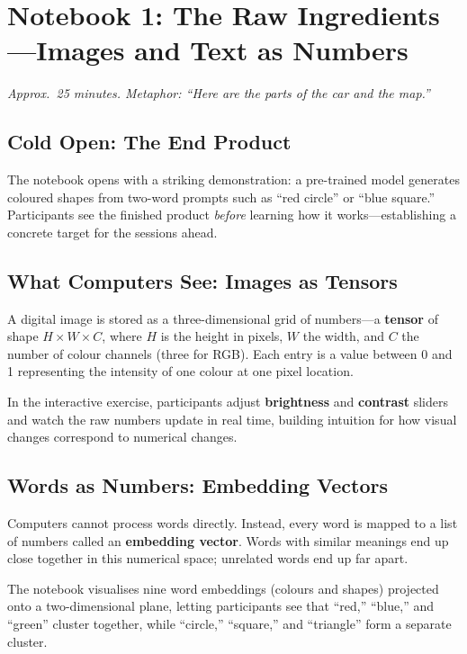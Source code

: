 \documentclass[11pt,a4paper]{article}
\begin{document}
\section{Notebook 1: The Raw Ingredients---Images and Text as Numbers}
\label{sec:nb1}

\textit{Approx.\ 25 minutes.  Metaphor: ``Here are the parts of the car
and the map.''}

\subsection{Cold Open: The End Product}

The notebook opens with a striking demonstration: a pre-trained model
generates coloured shapes from two-word prompts such as ``red circle'' or
``blue square.''  Participants see the finished product \emph{before}
learning how it works---establishing a concrete target for the sessions
ahead.

\subsection{What Computers See: Images as Tensors}

A digital image is stored as a three-dimensional grid of numbers---a
\textbf{tensor} of shape $H \times W \times C$, where $H$ is the height
in pixels, $W$ the width, and $C$ the number of colour channels (three
for RGB).  Each entry is a value between 0 and 1 representing the
intensity of one colour at one pixel location.

In the interactive exercise, participants adjust \textbf{brightness} and
\textbf{contrast} sliders and watch the raw numbers update in real time,
building intuition for how visual changes correspond to numerical changes.

\subsection{Words as Numbers: Embedding Vectors}

Computers cannot process words directly.  Instead, every word is mapped
to a list of numbers called an \textbf{embedding vector}.  Words with
similar meanings end up close together in this numerical space; unrelated
words end up far apart.

The notebook visualises nine word embeddings (colours and shapes)
projected onto a two-dimensional plane, letting participants see that
``red,'' ``blue,'' and ``green'' cluster together, while ``circle,''
``square,'' and ``triangle'' form a separate cluster.
\end{document}

